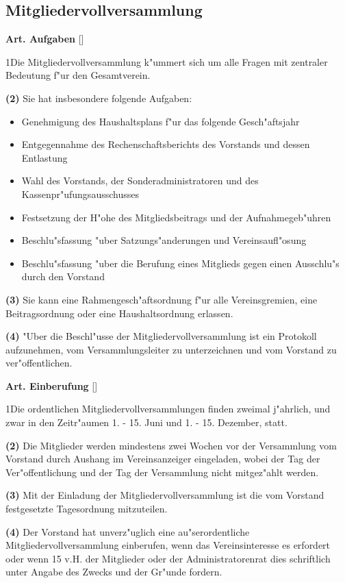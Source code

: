 \documentclass[12pt]{article}
\newcommand{\UAbschnitt}[1]{\subsection{#1}}
\newcommand{\Satz}[2]{

\begin{samepage}
{\bf (#1)} #2
\end{samepage}
}
\newenvironment{Artikel}[2]{
\bigskip \centerline{{\bf Art. #1} [#2]}
\nopagebreak
}{
}
\begin{document}
\UAbschnitt{Mitgliedervollversammlung}

\begin{Artikel}{15}{Aufgaben}

\Satz{1}{Die Mitgliedervollversammlung k"ummert sich um alle Fragen mit
zentraler Bedeutung f"ur den Gesamtverein.}

\Satz{2}{Sie hat insbesondere folgende Aufgaben:
\begin{itemize}
\item Genehmigung des Haushaltsplans f"ur das folgende Gesch"aftsjahr
\item Entgegennahme des Rechenschaftsberichts des Vorstands und dessen 
Entlastung
\item Wahl des Vorstands, der Sonderadministratoren und des 
Kassenpr"ufungsausschusses
\item Festsetzung der H"ohe des Mitgliedsbeitrags und der Aufnahmegeb"uhren
\item Beschlu"sfassung "uber Satzungs"anderungen und Vereinsaufl"osung
\item Beschlu"sfassung "uber die Berufung eines Mitglieds gegen einen 
Ausschlu"s durch den Vorstand
\end{itemize}}

\Satz{3}{Sie kann eine Rahmengesch"aftsordnung f"ur alle Vereinsgremien, eine
Beitragsordnung oder eine Haushaltsordnung erlassen.}

\Satz{4}{"Uber die Beschl"usse der Mitgliedervollversammlung ist ein 
Protokoll aufzunehmen, vom Versammlungsleiter zu unterzeichnen 
und vom Vorstand zu ver\-"offent\-lichen.}

\end{Artikel}

\begin{Artikel}{16}{Einberufung}

\Satz{1}{Die ordentlichen Mitgliedervollversammlungen finden zweimal 
j"ahrlich, und zwar in den Zeitr"aumen 1. - 15. Juni und 
1. - 15. Dezember, statt.}

\Satz{2}{Die Mitglieder werden mindestens zwei Wochen vor der Versammlung 
vom Vorstand durch Aushang im Vereinsanzeiger eingeladen, wobei der Tag der 
Ver\-"offent\-lichung und der Tag der Versammlung nicht mitgez"ahlt werden.}

\Satz{3}{Mit der Einladung der Mitgliedervollversammlung ist die vom 
Vorstand festgesetzte Tagesordnung mitzuteilen.}

\Satz{4}{Der Vorstand hat unverz"uglich  eine au"serordentliche 
Mitgliedervollversammlung einberufen, wenn das Vereinsinteresse es erfordert
oder wenn 15 v.H. der Mitglieder oder der Administratorenrat dies schriftlich 
unter Angabe des Zwecks und der Gr"unde fordern.}

\end{Artikel}
\end{document}
